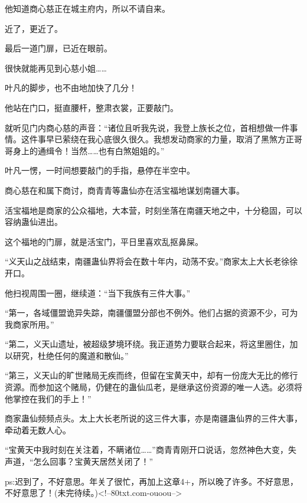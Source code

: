 \begin{this_body}
他知道商心慈正在城主府内，所以不请自来。

近了，更近了。

最后一道门扉，已近在眼前。

很快就能再见到心慈小姐……

叶凡的脚步，也不由地加快了几分！

他站在门口，挺直腰杆，整肃衣裳，正要敲门。

就听见门内商心慈的声音：“诸位且听我先说，我登上族长之位，首相想做一件事情。这件事早已萦绕在我心底很久很久。我想发动商家的力量，取消了黑煞方正哥哥身上的通缉令！当然……也有白煞姐姐的。”

叶凡一愣，一时间想要敲门的手指，悬停在半空中。

商心慈在和属下商讨，商青青等蛊仙亦在活宝福地谋划南疆大事。

活宝福地是商家的公众福地，大本营，时刻坐落在南疆天地之中，十分稳固，可以容纳蛊仙进出。

这个福地的门扉，就是活宝门，平日里喜欢乱抠鼻屎。

“义天山之战结束，南疆蛊仙界将会在数十年内，动荡不安。”商家太上大长老徐徐开口。

他扫视周围一圈，继续道：“当下我族有三件大事。”

“第一，各域僵盟诡异失踪，南疆僵盟分部也不例外。他们占据的资源不少，可为我商家所用。”

“第二，义天山遗址，被超级梦境环绕。我正道势力要联合起来，将这里圈住，加以研究，杜绝任何的魔道和散仙。”

“第三，义天山的旷世赌局无疾而终，但留在宝黄天中，却有一份庞大无比的修行资源。而参加这个赌局，仍健在的蛊仙瓜老，是继承这份资源的唯一人选。必须将他掌控在我们的手上！”

商家蛊仙频频点头。太上大长老所说的这三件大事，亦是南疆蛊仙界的三件大事，牵动着无数人心。

“宝黄天中我时刻在关注着，不瞒诸位……”商青青刚开口说话，忽然神色大变，失声道，“怎么回事？宝黄天居然关闭了！”

ps:迟到了，不好意思。年关了很忙，再加上这章4+，所以晚了许多。不好意思，不好意思了！(未完待续。)<!--80txt.com-ouoou-->

\end{this_body}

